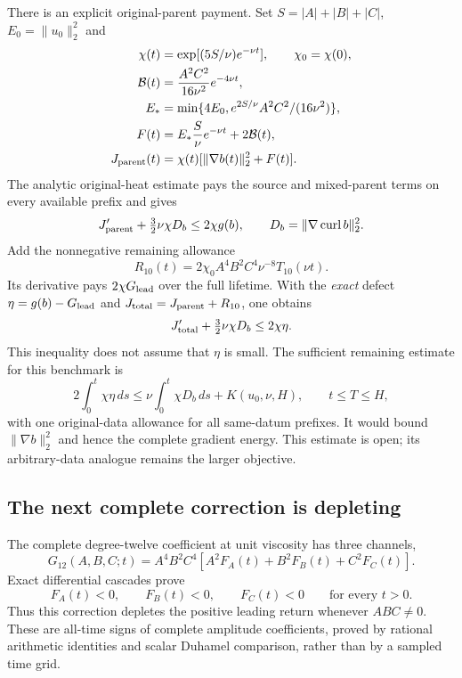 \documentclass[11pt]{article}
\theoremstyle{definition}
\begin{document}
There is an explicit original-parent payment. Set
$S=|A|+|B|+|C|$, $E_0=\|u_0\|_2^2$ and
\[
 \begin{aligned}
 \chi(t)&=\exp[(5S/\nu)e^{-\nu t}],\qquad \chi_0=\chi(0),\\
 \mathcal B(t)&=\frac{A^2C^2}{16\nu^2}e^{-4\nu t},\\
 E_*&=\min\{4E_0,e^{2S/\nu}A^2C^2/(16\nu^2)\},\\
 F(t)&=E_*\frac S\nu e^{-\nu t}+2\mathcal B(t),\\
 J_{\rm parent}(t)&=\chi(t)[\|\nabla b(t)\|_2^2+F(t)].
 \end{aligned}
\]
The analytic original-heat estimate pays the source and mixed-parent terms
on every available prefix and gives
\[
 J_{\rm parent}'+\tfrac32\nu\chi D_b\le2\chi g(b),
 \qquad D_b=\|\nabla\operatorname{curl}b\|_2^2.
\]
Add the nonnegative remaining allowance
\[
 R_{10}(t)=2\chi_0A^4B^2C^4\nu^{-8}T_{10}(\nu t).
\]
Its derivative pays $2\chi G_{\rm lead}$ over the full lifetime. With the
\emph{exact} defect $\eta=g(b)-G_{\rm lead}$ and
$J_{\rm total}=J_{\rm parent}+R_{10}$, one obtains
\begin{equation}\label{eq:current-defect}
 J_{\rm total}'+\tfrac32\nu\chi D_b\le2\chi\eta.
\end{equation}
This inequality does not assume that $\eta$ is small. The sufficient remaining
estimate for this benchmark is
\begin{equation}\label{eq:current-higher-payment}
 2\int_0^t\chi\eta\,ds
 \le\nu\int_0^t\chi D_b\,ds+K(u_0,\nu,H),\qquad t\le T\le H,
\end{equation}
with one original-data allowance for all same-datum prefixes. It would bound
$\|\nabla b\|_2^2$ and hence the complete gradient energy. This estimate is
open; its arbitrary-data analogue remains the larger objective.

\subsection{The next complete correction is depleting}

The complete degree-twelve coefficient at unit viscosity has three channels,
\[
 G_{12}(A,B,C;t)=A^4B^2C^4
       [A^2F_A(t)+B^2F_B(t)+C^2F_C(t)].
\]
Exact differential cascades prove
\[
 F_A(t)<0,\qquad F_B(t)<0,\qquad F_C(t)<0
 \qquad\text{for every }t>0.
\]
Thus this correction depletes the positive leading return whenever
$ABC\ne0$. These are all-time signs of complete amplitude coefficients,
proved by rational arithmetic identities and scalar Duhamel comparison,
rather than by a sampled time grid.
\end{document}
